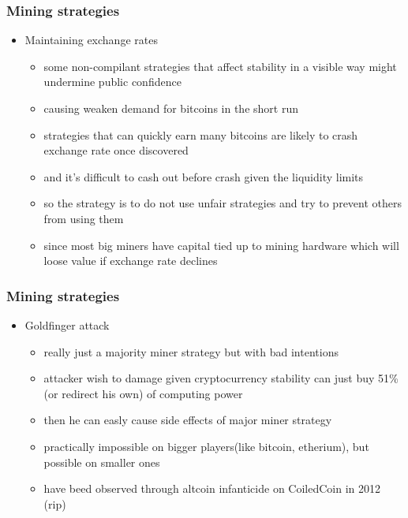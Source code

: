 \documentclass{beamer}
\begin{document}
\begin{frame}
    \frametitle{Mining strategies}
    \begin{itemize}
        \item<1-> Maintaining exchange rates
        \begin{itemize}
            \item<2-> some non-compilant strategies that affect stability in a visible way might undermine public confidence
            \item<3-> causing weaken demand for bitcoins in the short run
            \item<4-> strategies that can quickly earn many bitcoins are likely to crash exchange rate once discovered
            \item<5-> and it's difficult to cash out before crash given the liquidity limits
            \item<6-> so the strategy is to do not use unfair strategies and try to prevent others from using them
            \item<7-> since most big miners have capital tied up to mining hardware which will loose value if exchange rate declines
        \end{itemize}   
    \end{itemize}
\end{frame}

\begin{frame}
    \frametitle{Mining strategies}
    \begin{itemize}
        \item<1-> Goldfinger attack
        \begin{itemize}
            \item<2-> really just a majority miner strategy but with bad intentions
            \item<3-> attacker wish to damage given cryptocurrency stability can just buy 51\%(or redirect his own) of computing power
            \item<4-> then he can easly cause side effects of major miner strategy
            \item<5-> practically impossible on bigger players(like bitcoin, etherium), but possible on smaller ones
            \item<6-> have beed observed through altcoin infanticide on CoiledCoin in 2012 (rip)
        \end{itemize}   
    \end{itemize}
\end{frame}
\end{document}
